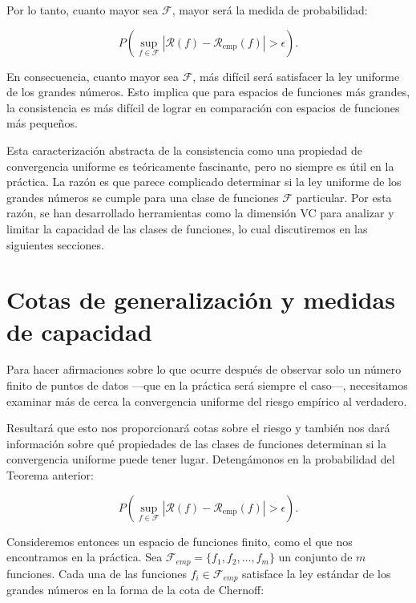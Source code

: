 \documentclass{report}
\begin{document}
Por lo tanto, cuanto mayor sea \(\mathcal{F}\), mayor será la medida de probabilidad:

\[
P\left(\sup_{f \in \mathcal{F}} |\mathcal{R}(f) - \mathcal{R}_{\text{emp}}(f)| > \epsilon \right).
\]

En consecuencia, cuanto mayor sea \(\mathcal{F}\), más difícil será satisfacer la ley uniforme de los grandes números. 
Esto implica que para espacios de funciones más grandes, la consistencia es más difícil de lograr en comparación 
con espacios de funciones más pequeños.\newline


Esta caracterización abstracta de la consistencia como una propiedad de convergencia uniforme es teóricamente 
fascinante, pero no siempre es útil en la práctica. La razón es que parece complicado determinar si la ley uniforme 
de los grandes números se cumple para una clase de funciones \(\mathcal{F}\) particular. Por esta razón, se han desarrollado 
herramientas como la dimensión VC para analizar y limitar la capacidad de las clases de funciones, lo cual discutiremos 
en las siguientes secciones.\newline

\section{Cotas de generalización y medidas de capacidad}

Para hacer afirmaciones sobre lo que ocurre después de observar solo un número finito de puntos de datos 
—que en la práctica será siempre el caso—, necesitamos examinar más de cerca la 
convergencia uniforme del riesgo empírico al verdadero.\newline

Resultará que esto nos proporcionará cotas sobre el riesgo y también nos dará información sobre 
qué propiedades de las clases de funciones determinan si la convergencia uniforme puede tener lugar. Detengámonos
en la probabilidad del Teorema anterior:

\begin{equation}
P\left(\sup_{f \in \mathcal{F}} |\mathcal{R}(f) - \mathcal{R}_{\text{emp}}(f)| > \epsilon \right). \label{eq:med_unif_riesgo_riesgo_emp}
\end{equation}

Consideremos entonces un espacio de funciones finito, como el que nos encontramos en la práctica. Sea
\(\mathcal{F}_{emp} = \{f_1, f_2, \dots, f_m\}\) un conjunto de \(m\) funciones. Cada una de las funciones 
\(f_i \in \mathcal{F}_{emp}\) satisface la ley estándar de los grandes números en la forma de la cota de Chernoff:
\end{document}
